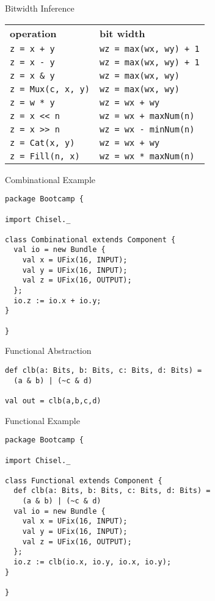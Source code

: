 \documentclass[xcolor=pdflatex,dvipsnames,table]{beamer}
\begin{document}
\begin{frame}[fragile]{Bitwidth Inference}
\begin{center}
\begin{tabular}{ll}
{\bf operation} & {\bf bit width} \\ 
\verb|z = x + y| & \verb|wz = max(wx, wy) + 1| \\
\verb+z = x - y+ & \verb|wz = max(wx, wy) + 1|\\
\verb+z = x & y+ & \verb+wz = max(wx, wy)+ \\
\verb+z = Mux(c, x, y)+ & \verb+wz = max(wx, wy)+ \\
\verb+z = w * y+ & \verb!wz = wx + wy! \\
\verb+z = x << n+ & \verb!wz = wx + maxNum(n)! \\
\verb+z = x >> n+ & \verb+wz = wx - minNum(n)+ \\
\verb+z = Cat(x, y)+ & \verb!wz = wx + wy! \\
\verb+z = Fill(n, x)+ & \verb+wz = wx * maxNum(n)+ \\
\end{tabular}
\end{center}
\end{frame}

\begin{frame}[fragile]{Combinational Example}
\begin{lstlisting}
package Bootcamp {

import Chisel._

class Combinational extends Component {
  val io = new Bundle {
    val x = UFix(16, INPUT);
    val y = UFix(16, INPUT);
    val z = UFix(16, OUTPUT);
  };
  io.z := io.x + io.y;
}

}
\end{lstlisting}
\end{frame}

\begin{frame}[fragile]{Functional Abstraction}
\begin{lstlisting}
def clb(a: Bits, b: Bits, c: Bits, d: Bits) = 
  (a & b) | (~c & d)

val out = clb(a,b,c,d)
\end{lstlisting}
\end{frame}

\begin{frame}{Functional Example}
\begin{lstlisting}
package Bootcamp {

import Chisel._

class Functional extends Component {
  def clb(a: Bits, b: Bits, c: Bits, d: Bits) = 
    (a & b) | (~c & d)
  val io = new Bundle {
    val x = UFix(16, INPUT);
    val y = UFix(16, INPUT);
    val z = UFix(16, OUTPUT);
  };
  io.z := clb(io.x, io.y, io.x, io.y);
}

}
\end{lstlisting}
\end{frame}
\end{document}
